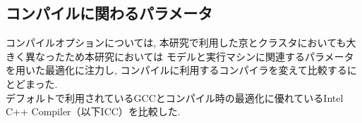 \subsection{コンパイルに関わるパラメータ}
コンパイルオプションについては, 本研究で利用した京とクラスタにおいても大きく異なったため本研究においては
モデルと実行マシンに関連するパラメータを用いた最適化に注力し, コンパイルに利用するコンパイラを変えて比較するにとどまった.\\
デフォルトで利用されているGCCとコンパイル時の最適化に優れているIntel C++ Compiler（以下ICC）\cite{icc}を比較した.
